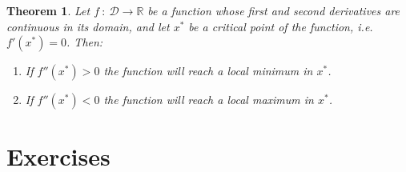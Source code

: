 \documentclass[a4paper,11pt]{article}
\theoremstyle{definition}
\theoremstyle{plain}
\newtheorem{theorem}{Theorem}
\begin{document}
\begin{theorem}
Let \(f \: : \: \mathcal{D}\rightarrow\mathbb{R}\) be
a function whose first and second derivatives are continuous in its
domain, and let \(x^*\) be a critical point of the function, i.e.
\(f'\left(x^*\right) = 0\). Then:

\begin{enumerate}
\def\labelenumi{\arabic{enumi}.}
\item
  If \(f''\left(x^*\right) > 0\) the function will reach a local minimum
  in \(x^*\).
\item
  If \(f''\left(x^*\right) < 0\) the function will reach a local maximum
  in \(x^*\).
\end{enumerate}
\end{theorem}

\section{Exercises}\label{exercises}
\end{document}
